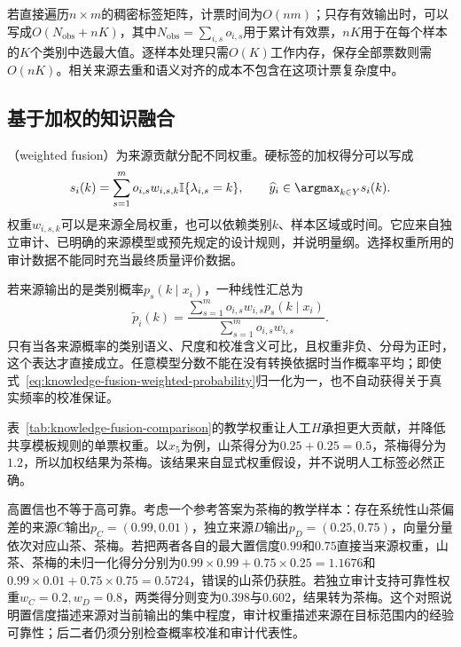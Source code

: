 若直接遍历$n\times m$的稠密标签矩阵，计票时间为$O(nm)$；只存有效输出时，可以写成$O(N_{\mathrm{obs}}+nK)$，其中$N_{\mathrm{obs}}=\sum_{i,s}o_{i,s}$用于累计有效票，$nK$用于在每个样本的$K$个类别中选最大值。逐样本处理只需$O(K)$工作内存，保存全部票数则需$O(nK)$。相关来源去重和语义对齐的成本不包含在这项计票复杂度中。

\subsection{基于加权的知识融合}
\label{sec:knowledge-fusion-weighting}

（weighted fusion）为来源贡献分配不同权重。硬标签的加权得分可以写成
\begin{equation}
  s_i(k)
  =\sum_{s=1}^{m}o_{i,s}w_{i,s,k}
    \mathbb{I}\{\lambda_{i,s}=k\},
  \qquad
  \widehat y_i\in\argmax_{k\in Y}s_i(k).
  \label{eq:knowledge-fusion-weighted-vote}
\end{equation}
权重$w_{i,s,k}$可以是来源全局权重，也可以依赖类别$k$、样本区域或时间。它应来自独立审计、已明确的来源模型或预先规定的设计规则，并说明量纲。选择权重所用的审计数据不能同时充当最终质量评价数据。

若来源输出的是类别概率$p_s(k\mid x_i)$，一种线性汇总为
\begin{equation}
  \widetilde p_i(k)
  =\frac{\sum_{s=1}^{m}o_{i,s}w_{i,s}p_s(k\mid x_i)}
  {\sum_{s=1}^{m}o_{i,s}w_{i,s}}.
  \label{eq:knowledge-fusion-weighted-probability}
\end{equation}
只有当各来源概率的类别语义、尺度和校准含义可比，且权重非负、分母为正时，这个表达才直接成立。任意模型分数不能在没有转换依据时当作概率平均；即使式~\eqref{eq:knowledge-fusion-weighted-probability}归一化为一，也不自动获得关于真实频率的校准保证。

表~\ref{tab:knowledge-fusion-comparison}的教学权重让人工$H$承担更大贡献，并降低共享模板规则的单票权重。以$x_5$为例，山茶得分为$0.25+0.25=0.5$，茶梅得分为$1.2$，所以加权结果为茶梅。该结果来自显式权重假设，并不说明人工标签必然正确。

高置信也不等于高可靠。考虑一个参考答案为茶梅的教学样本：存在系统性山茶偏差的来源$C$输出$p_C=(0.99,0.01)$，独立来源$D$输出$p_D=(0.25,0.75)$，向量分量依次对应山茶、茶梅。若把两者各自的最大置信度$0.99$和$0.75$直接当来源权重，山茶、茶梅的未归一化得分分别为$0.99\times0.99+0.75\times0.25=1.1676$和$0.99\times0.01+0.75\times0.75=0.5724$，错误的山茶仍获胜。若独立审计支持可靠性权重$w_C=0.2,w_D=0.8$，两类得分则变为$0.398$与$0.602$，结果转为茶梅。这个对照说明置信度描述来源对当前输出的集中程度，审计权重描述来源在目标范围内的经验可靠性；后二者仍须分别检查概率校准和审计代表性。

